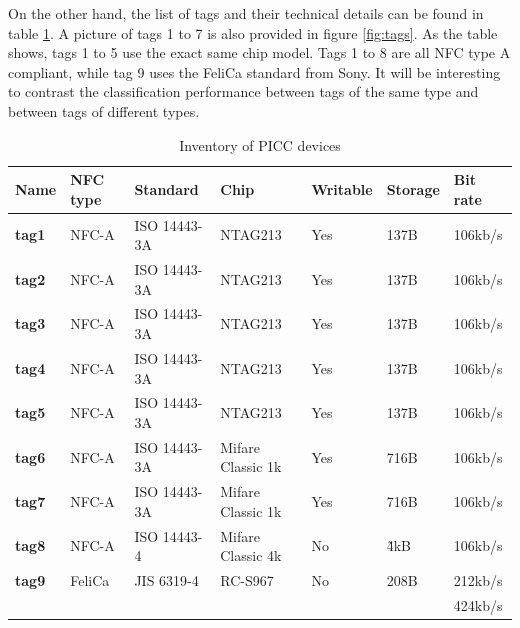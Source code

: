 On the other hand, the list of tags and their technical details can be found in table \ref{tab:picc-inventory}. A picture of tags 1 to 7 is also provided in figure \ref{fig:tags}. As the table shows, tags 1 to 5 use the exact same chip model. Tags 1 to 8 are all NFC type A compliant, while tag 9 uses the FeliCa standard from Sony. It will be interesting to contrast the classification performance between tags of the same type and between tags of different types.

\begin{table}[h!]
  \centering
  \begin{tabular}{|l|l|l|l|l|l|l|}
    \hline
    \textbf{Name} & \textbf{NFC type} & \textbf{Standard} & \textbf{Chip}     & \textbf{Writable} & \textbf{Storage} & \textbf{Bit rate} \\ \hline
    \textbf{tag1} & NFC-A             & ISO 14443-3A      & NTAG213           & Yes               & 137B             & 106kb/s         \\ \hline
    \textbf{tag2} & NFC-A             & ISO 14443-3A      & NTAG213           & Yes               & 137B             & 106kb/s         \\ \hline
    \textbf{tag3} & NFC-A             & ISO 14443-3A      & NTAG213           & Yes               & 137B             & 106kb/s         \\ \hline
    \textbf{tag4} & NFC-A             & ISO 14443-3A      & NTAG213           & Yes               & 137B             & 106kb/s         \\ \hline
    \textbf{tag5} & NFC-A             & ISO 14443-3A      & NTAG213           & Yes               & 137B             & 106kb/s         \\ \hline \hline
    \textbf{tag6} & NFC-A             & ISO 14443-3A      & Mifare Classic 1k & Yes               & 716B             & 106kb/s         \\ \hline
    \textbf{tag7} & NFC-A             & ISO 14443-3A      & Mifare Classic 1k & Yes               & 716B             & 106kb/s         \\ \hline \hline
    \textbf{tag8} & NFC-A             & ISO 14443-4       & Mifare Classic 4k & No                & \~4kB            & 106kb/s         \\ \hline
    \textbf{tag9} & FeliCa            & JIS 6319-4        & RC-S967           & No                & 208B             & 212kb/s         \\
                  &                   &                   &                   &                   &                  & 424kb/s         \\ \hline
  \end{tabular}
  \caption{Inventory of PICC devices}
  \label{tab:picc-inventory}
\end{table}

